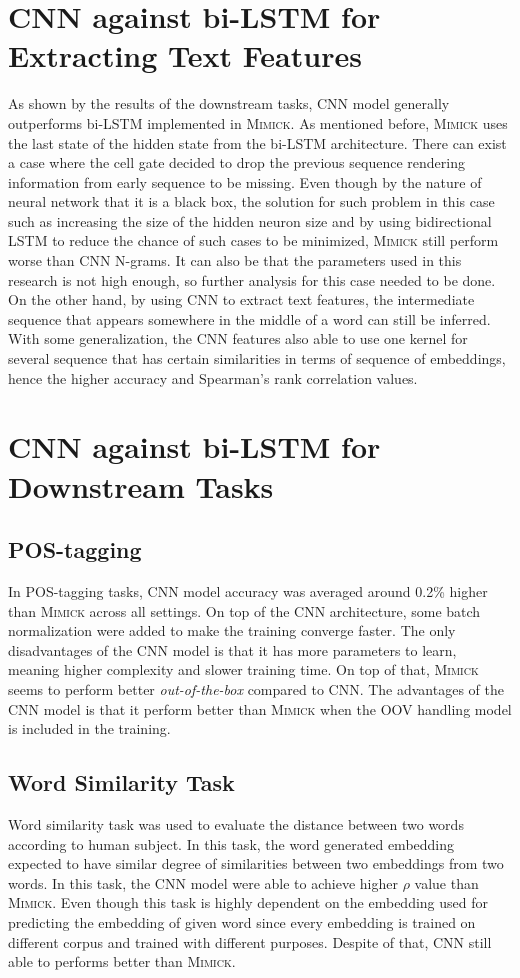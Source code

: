 \section{CNN against bi-LSTM for Extracting Text Features}
As shown by the results of the downstream tasks, CNN model generally
outperforms bi-LSTM implemented in \textsc{Mimick}. As mentioned
before, \textsc{Mimick} uses the last state of the hidden state from
the bi-LSTM architecture. There can exist a case where the cell gate
decided to drop the previous sequence rendering information from early
sequence to be missing. Even though by the nature of neural network
that it is a black box, the solution for such problem in this case
such as increasing the size of the hidden neuron size and by using
bidirectional LSTM to reduce the chance of such cases to be minimized,
\textsc{Mimick} still perform worse than CNN N-grams. It can also be
that the parameters used in this research is not high enough, so
further analysis for this case needed to be done. On the other hand,
by using CNN to extract text features, the intermediate sequence that
appears somewhere in the middle of a word can still be inferred. With
some generalization, the CNN features also able to use one kernel for
several sequence that has certain similarities in terms of sequence of
embeddings, hence the higher accuracy and Spearman's rank correlation
values.

\section{CNN against bi-LSTM for Downstream Tasks}
\subsection{POS-tagging}
In POS-tagging tasks, CNN model accuracy was averaged around 0.2\% higher than
\textsc{Mimick} across all settings. On top of the CNN architecture, some batch
normalization were added to make the training converge faster. The
only disadvantages of the CNN model is that it has more parameters to
learn, meaning higher complexity and slower training time. On top of
that, \textsc{Mimick} seems to perform better \textit{out-of-the-box}
compared to CNN. The advantages of the CNN model is that it perform
better than \textsc{Mimick} when the OOV handling model is included in
the training.

\subsection{Word Similarity Task}
Word similarity task was used to evaluate the distance between two
words according to human subject. In this task, the word generated
embedding expected to have similar degree of similarities between two
embeddings from two words. In this task, the CNN model were able to
achieve higher $\rho$ value than \textsc{Mimick}. Even though this
task is highly dependent on the embedding used for predicting the
embedding of given word since every embedding is trained on different
corpus and trained with different purposes. Despite of that, CNN still
able to performs better than \textsc{Mimick}.

